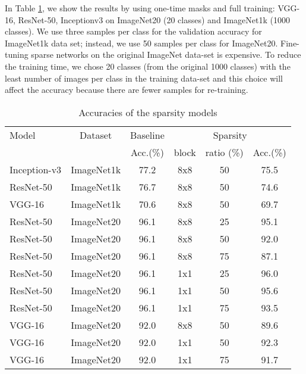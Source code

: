 \documentclass[sigconf]{acmart}
\begin{document}
In Table \ref{tab_acc}, we show the results by using one-time masks
and full training: VGG-16, ResNet-50, Inceptionv3 on ImageNet20 (20
classes) and ImageNet1k (1000 classes).  We use three samples per
class for the validation accuracy for ImageNet1k data set; instead, we
use 50 samples per class for ImageNet20. Fine-tuning sparse networks
on the original ImageNet data-set \cite{deng2009imagenet} is
expensive. To reduce the training time, we chose 20 classes (from the
original 1000 classes) with the least number of images per class in
the training data-set and this choice will affect the accuracy because
there are fewer samples for re-training.


\begin{table}[ht]
\caption{Accuracies of the sparsity models}
\label{tab_acc}
\begin{center} 
\scalebox{0.9}
{
\begin{tabular}{|l|c|c|c|c|c|}
\hline
\rule[-1ex]{0pt}{3.5ex}  Model & Dataset & Baseline  & \multicolumn{3}{c|}{Sparsity}\\
\rule[-1ex]{0pt}{3.5ex}  {} & {} & Acc.(\%) & block & ratio (\%) & Acc.(\%)    \\\hline\hline
\rule[-1ex]{0pt}{3.5ex}  Inception-v3 & ImageNet1k & 77.2 & 8x8 & 50 & 75.5  \\\hline
\rule[-1ex]{0pt}{3.5ex}  ResNet-50 & ImageNet1k & 76.7 & 8x8 & 50 & 74.6  \\\hline
\rule[-1ex]{0pt}{3.5ex}  VGG-16    & ImageNet1k & 70.6 & 8x8 & 50 & 69.7  \\\hline \hline
\rule[-1ex]{0pt}{3.5ex}  ResNet-50 & ImageNet20 & 96.1 & 8x8 & 25 & 95.1  \\\hline
\rule[-1ex]{0pt}{3.5ex}  ResNet-50 & ImageNet20 & 96.1 & 8x8 & 50 & 92.0  \\\hline
\rule[-1ex]{0pt}{3.5ex}  ResNet-50 & ImageNet20 & 96.1 & 8x8 & 75 & 87.1  \\\hline
\rule[-1ex]{0pt}{3.5ex}  ResNet-50 & ImageNet20 & 96.1 & 1x1 & 25 & 96.0  \\\hline
\rule[-1ex]{0pt}{3.5ex}  ResNet-50 & ImageNet20 & 96.1 & 1x1 & 50 & 95.6  \\\hline
\rule[-1ex]{0pt}{3.5ex}  ResNet-50 & ImageNet20 & 96.1 & 1x1 & 75 & 93.5  \\\hline
\rule[-1ex]{0pt}{3.5ex}  VGG-16    & ImageNet20 & 92.0 & 8x8 & 50 & 89.6  \\\hline
\rule[-1ex]{0pt}{3.5ex}  VGG-16    & ImageNet20 & 92.0 & 1x1 & 50 & 92.3  \\\hline
\rule[-1ex]{0pt}{3.5ex}  VGG-16    & ImageNet20 & 92.0 & 1x1 & 75 & 91.7  \\\hline
\end{tabular}\vspace{-20pt}
}
\end{center}
\end{table}
\end{document}
